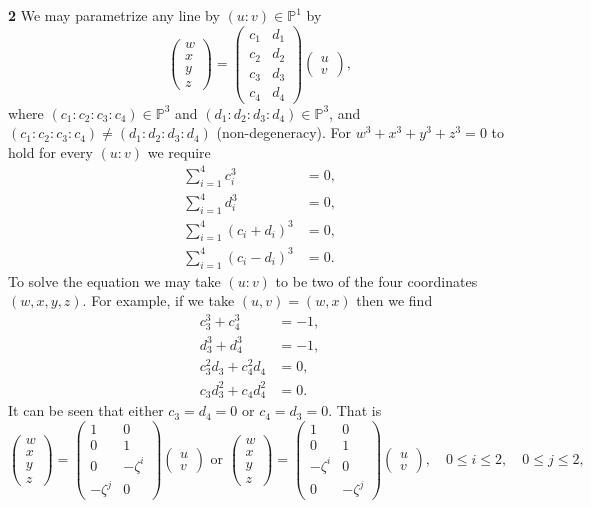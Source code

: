 \documentclass{article}
\makeatletter
\newcommand*{\shifttext}[1]{%
  \settowidth{\@tempdima}{#1}%
  \hspace{-\@tempdima}#1%
}
\newcommand{\plabel}[1]{%
\shifttext{\textbf{#1}\quad}%
}
\makeatother
\begin{document}
\plabel{2}%
We may parametrize any line by $(u:v)\in \mathbb{P}^1$ by
\[ \begin{pmatrix}
    w \\ x \\ y \\ z
\end{pmatrix} = \begin{pmatrix}
    c_1 & d_1 \\ c_2 & d_2 \\ c_3 & d_3 \\ c_4 & d_4
\end{pmatrix} \begin{pmatrix}
    u \\ v
\end{pmatrix}, \]
where $(c_1:c_2:c_3:c_4)\in\mathbb{P}^3$ and $(d_1:d_2:d_3:d_4)\in\mathbb{P}^3$, and $(c_1:c_2:c_3:c_4) \neq (d_1:d_2:d_3:d_4)$ (non-degeneracy).
For $w^3+x^3+y^3+z^3=0$ to hold for every $(u:v)$ we require
\begin{align*}
    \sum_{i=1}^4 c_i^3 &= 0, \\
    \sum_{i=1}^4 d_i^3 &= 0, \\
    \sum_{i=1}^4 (c_i+d_i)^3 &= 0, \\
    \sum_{i=1}^4 (c_i-d_i)^3 &= 0.
\end{align*}
To solve the equation we may take $(u:v)$ to be two of the four coordinates $(w,x,y,z)$.
For example, if we take $(u,v) = (w,x)$ then we find
\begin{align*}
    c_3^3 + c_4^3 &= -1, \\
    d_3^3 + d_4^3 &= -1, \\
    c_3^2 d_3 + c_4^2 d_4 &= 0, \\
    c_3 d_3^2 + c_4 d_4^2 &= 0.
\end{align*}
It can be seen that either $c_3=d_4=0$ or $c_4=d_3=0$.
That is
\[ \begin{pmatrix}
    w \\ x \\ y \\ z
\end{pmatrix} = \begin{pmatrix}
    1 & 0 \\ 0 & 1 \\ 0 & -\zeta^i \\ -\zeta^j & 0
\end{pmatrix} \begin{pmatrix}
    u \\ v
\end{pmatrix} \text{ or } \begin{pmatrix}
    w \\ x \\ y \\ z
\end{pmatrix} = \begin{pmatrix}
    1 & 0 \\ 0 & 1 \\ -\zeta^i & 0 \\ 0 & -\zeta^j
\end{pmatrix} \begin{pmatrix}
    u \\ v
\end{pmatrix}, \quad 0\le i \le 2, \quad 0\le j\le 2, \]
\end{document}
